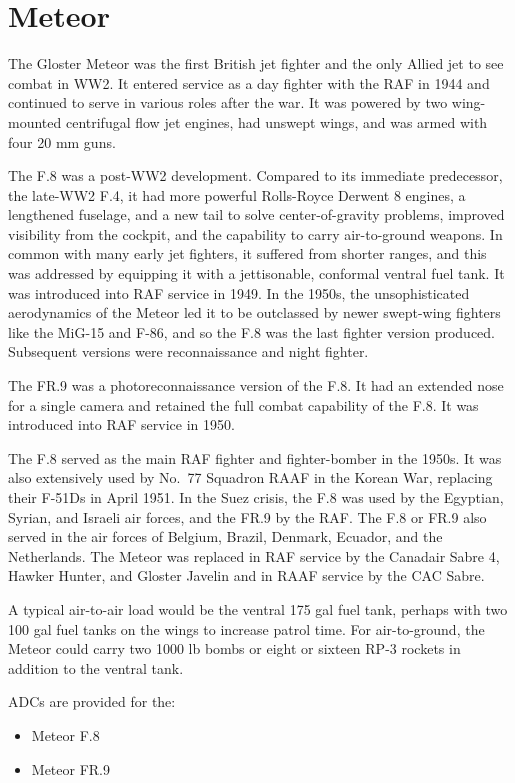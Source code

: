 \section*{Meteor}

The Gloster Meteor was the first British jet fighter and the only Allied jet to see combat in WW2. It entered service as a day fighter with the RAF in 1944 and continued to serve in various roles after the war. It was powered by two wing-mounted centrifugal flow jet engines, had unswept wings, and was armed with four 20 mm guns.

The F.8 was a post-WW2 development. Compared to its immediate predecessor, the late-WW2 F.4, it had more powerful Rolls-Royce Derwent 8 engines, a lengthened fuselage, and a new tail to solve center-of-gravity problems, improved visibility from the cockpit, and the capability to carry air-to-ground weapons. In common with many early jet fighters, it suffered from shorter ranges, and this was addressed by equipping it with a jettisonable, conformal ventral fuel tank. It was introduced into RAF service in 1949. In the 1950s, the unsophisticated aerodynamics of the Meteor led it to be outclassed by newer swept-wing fighters like the MiG-15 and F-86, and so the F.8 was the last fighter version produced. Subsequent versions were reconnaissance and night fighter.
 
The FR.9 was a photoreconnaissance version of the F.8. It had an extended nose for a single camera and retained the full combat capability of the F.8. It was introduced into RAF service in 1950.

The F.8 served as the main RAF fighter and fighter-bomber in the 1950s. It was also extensively used by No.~77 Squadron RAAF in the Korean War, replacing their F-51Ds in April 1951. In the Suez crisis, the F.8 was used by the Egyptian, Syrian, and Israeli air forces, and the FR.9 by the RAF. The F.8 or FR.9 also served in the air forces of Belgium, Brazil, Denmark, Ecuador, and the Netherlands. The Meteor was replaced in RAF service by the Canadair Sabre 4, Hawker Hunter, and Gloster Javelin and in RAAF service by the CAC Sabre.


A typical air-to-air load would be the ventral 175 gal fuel tank, perhaps with two 100 gal fuel tanks on the wings to increase patrol time. For air-to-ground, the Meteor could carry two 1000 lb bombs or eight or sixteen RP-3 rockets in addition to the ventral tank.

ADCs are provided for the:
\begin{itemize}
\item Meteor F.8
\item Meteor FR.9
\end{itemize}
